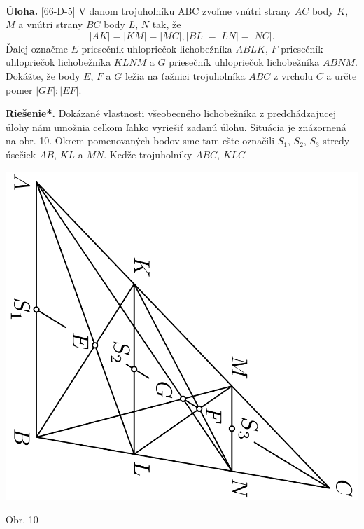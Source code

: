 \documentclass[11pt,a4paper,oneside,final]{book}
\newcommand{\ul}{\textbf{Úloha.} }
\newcommand{\rieh}{\textbf{Riešenie*.} }
\begin{document}
\\
\begin{tcolorbox}[breakable,notitle,boxrule=0pt,colback=light-gray,colframe=light-gray]\ul [66-D-5] V danom trojuholníku ABC zvoľme vnútri strany $AC$ body $K$, $M$ a vnútri strany $BC$ body $L$, $N$ tak, že
$$|AK| = |KM| = |MC|, |BL| = |LN| = |NC|.$$
Ďalej označme $E$ priesečník uhlopriečok lichobežníka $ABLK$, $F$ priesečník uhlopriečok lichobežníka $KLNM$ a $G$ priesečník uhlopriečok lichobežníka $ABNM$. Dokážte, že body $E$, $F$ a $G$ ležia na ťažnici trojuholníka $ABC$ z vrcholu $C$ a určte pomer $|GF| : |EF|$.

\end{tcolorbox}

\rieh
Dokázané vlastnosti všeobecného lichobežníka z predchádzajucej úlohy nám umožnia celkom ľahko vyriešiť zadanú úlohu. Situácia je znázornená na obr. 10. Okrem pomenovaných bodov sme tam ešte označili $S_1$, $S_2$, $S_3$ stredy úsečiek $AB$, $KL$ a $MN$. Keďže trojuholníky $ABC$, $KLC$
\begin{center}
\includegraphics{66D52}

Obr. 10
\end{center}
\end{document}
